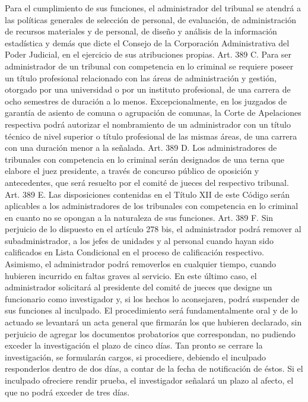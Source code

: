     Para el cumplimiento de sus funciones, el administrador del tribunal se atendrá a las políticas generales de selección de personal, de evaluación, de administración de recursos materiales y de personal, de diseño y análisis de la información estadística y demás que dicte el Consejo de la Corporación Administrativa del Poder Judicial, en el ejercicio de sus atribuciones propias.
    Art. 389 C. Para ser administrador de un tribunal con competencia en lo criminal se requiere poseer un título profesional relacionado con las áreas de administración y gestión, otorgado por una universidad o por un instituto profesional, de una carrera de ocho semestres de duración a lo menos. Excepcionalmente, en los juzgados de garantía de asiento de comuna o agrupación de comunas, la Corte de Apelaciones respectiva podrá autorizar el nombramiento de un administrador con un título técnico de nivel superior o título profesional de las mismas áreas, de una carrera con una duración menor a la señalada.
    Art. 389 D. Los administradores de tribunales con competencia en lo criminal serán designados de una terna que elabore el juez presidente, a través de concurso público de oposición y antecedentes, que será resuelto por el comité de jueces del respectivo tribunal.
    Art. 389 E. Las disposiciones contenidas en el Título XII de este Código serán aplicables a los administradores de los tribunales con competencia en lo criminal en cuanto no se opongan a la naturaleza de sus funciones.
    Art. 389 F. Sin perjuicio de lo dispuesto en el artículo 278 bis, el administrador podrá remover al subadministrador, a los jefes de unidades y al personal cuando hayan sido calificados en Lista Condicional en el proceso de calificación respectivo.
    Asimismo, el administrador podrá removerlos en cualquier tiempo, cuando hubieren incurrido en faltas graves al servicio.
    En este último caso, el administrador solicitará al presidente del comité de jueces que designe un funcionario como investigador y, si los hechos lo aconsejaren, podrá suspender de sus funciones al inculpado. El procedimiento será fundamentalmente oral y de lo actuado se levantará un acta general que firmarán los que hubieren declarado, sin perjuicio de agregar los documentos probatorios que correspondan, no pudiendo exceder la investigación el plazo de cinco días. Tan pronto se cerrare la investigación, se formularán cargos, si procediere, debiendo el inculpado responderlos dentro de dos días, a contar de la fecha de notificación de éstos. Si el inculpado ofreciere rendir prueba, el investigador señalará un plazo al afecto, el que no podrá exceder de tres días.
